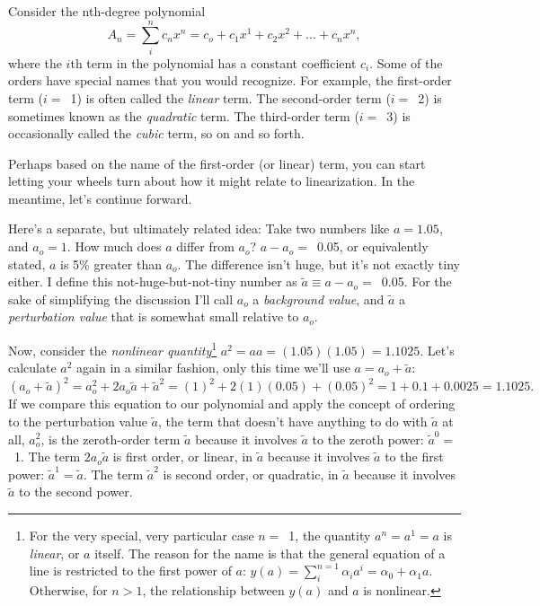 Consider the nth-degree polynomial
\begin{equation*}
  A_n = \sum\limits_i^n c_n x^n = c_o + c_1 x^1 + c_2 x^2 + \dots + c_n x^n,
\end{equation*}
where the $i$th term in the polynomial has a constant coefficient $c_i$. Some of
the orders have special names that you would recognize. For example, the
first-order term ($i =$~1) is often called the \emph{linear} term. The
second-order term ($i =$~2) is sometimes known as the \emph{quadratic} term. The
third-order term ($i =$~3) is occasionally called the \emph{cubic} term, so on
and so forth.

Perhaps based on the name of the first-order (or linear) term, you can start
letting your wheels turn about how it might relate to linearization. In the
meantime, let's continue forward.

Here's a separate, but ultimately related idea: Take two numbers like
$a = 1.05$, and $a_o = 1$. How much does $a$ differ from $a_o$?
$a - a_o =$~0.05, or equivalently stated, $a$ is 5\% greater than $a_o$. The
difference isn't huge, but it's not exactly tiny either. I define this
not-huge-but-not-tiny number as $ \tilde a \equiv a - a_o =$~0.05. For the sake
of simplifying the discussion I'll call $a_o$ a \emph{background value}, and
$\tilde a$ a \emph{perturbation value} that is somewhat small relative to $a_o$.

Now, consider the \emph{nonlinear quantity}\footnote{For the very special, very
  particular case $n =$~1, the quantity $a^n = a^1 = a$ is \emph{linear}, or $a$
  itself. The reason for the name is that the general equation of a line is
  restricted to the first power of $a$:
  $y(a) = \sum_i^{n=1} \alpha_i a^i = \alpha_0 + \alpha_1 a$. Otherwise, for
  $n > 1$, the relationship between $y(a)$ and $a$ is nonlinear.}
$a^2 = a a = (1.05)(1.05) = 1.1025$. Let's calculate $a^2$ again in a similar
fashion, only this time we'll use $a = a_o + \tilde a$:
\begin{equation*}
  (a_o + \tilde a)^2 = a_o^2 + 2 a_o \tilde a + {\tilde a}^2 = (1)^2 + 2(1)(0.05) + (0.05)^2 = 1 + 0.1 + 0.0025 = 1.1025.
\end{equation*}
If we compare this equation to our polynomial and apply the concept of ordering
to the perturbation value $\tilde a$, the term that doesn't have anything to do
with $\tilde a$ at all, $a_o^2$, is the zeroth-order term $\tilde a$ because it
involves $\tilde a$ to the zeroth power: $\tilde a^0 =$~1. The term
$2 a_o \tilde a$ is first order, or linear, in $\tilde a$ because it involves
$\tilde a$ to the first power: $\tilde a^1 =\tilde a$. The term $\tilde a^2$ is
second order, or quadratic, in $\tilde a$ because it involves $\tilde a$ to
the second power.

